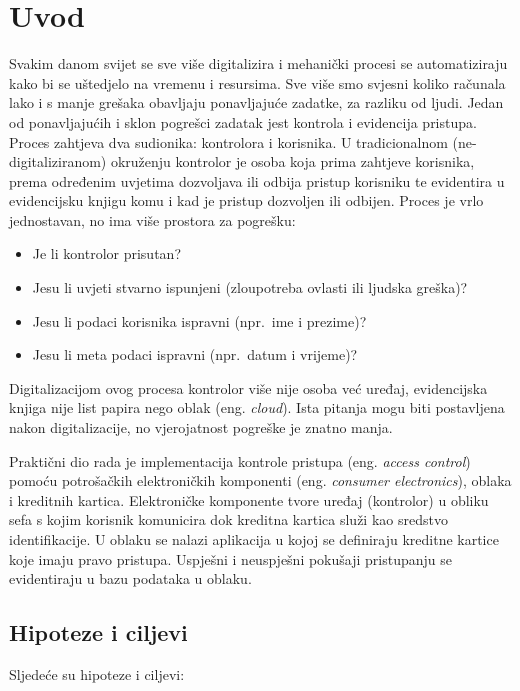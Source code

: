 \chapter{Uvod}

Svakim danom svijet se sve više digitalizira i mehanički procesi se automatiziraju kako bi se uštedjelo na vremenu i resursima.
Sve više smo svjesni koliko računala lako i s manje grešaka obavljaju ponavljajuće zadatke, za razliku od ljudi.
Jedan od ponavljajućih i sklon pogrešci zadatak jest kontrola i evidencija pristupa.
Proces zahtjeva dva sudionika: kontrolora i korisnika.
U tradicionalnom (ne-digitaliziranom) okruženju kontrolor je osoba koja prima zahtjeve korisnika, prema određenim uvjetima
dozvoljava ili odbija pristup korisniku te evidentira u evidencijsku knjigu komu i kad je pristup dozvoljen ili odbijen.
Proces je vrlo jednostavan, no ima više prostora za pogrešku:
\begin{itemize}
    \item Je li kontrolor prisutan?
    \item Jesu li uvjeti stvarno ispunjeni (zloupotreba ovlasti ili ljudska greška)?
    \item Jesu li podaci korisnika ispravni (npr.\ ime i prezime)?
    \item Jesu li meta podaci ispravni (npr.\ datum i vrijeme)?
\end{itemize}
Digitalizacijom ovog procesa kontrolor više nije osoba već uređaj, evidencijska knjiga nije list papira nego oblak (eng. \textit{cloud}).
Ista pitanja mogu biti postavljena nakon digitalizacije, no vjerojatnost pogreške je znatno manja.

Praktični dio rada je implementacija kontrole pristupa (eng. \textit{access control}) pomoću potrošačkih elektroničkih
komponenti (eng. \textit{consumer electronics}), oblaka i kreditnih kartica.
Elektroničke komponente tvore uređaj (kontrolor) u obliku sefa s kojim korisnik komunicira dok kreditna kartica služi kao sredstvo identifikacije.
U oblaku se nalazi aplikacija u kojoj se definiraju kreditne kartice koje imaju pravo pristupa.
Uspješni i neuspješni pokušaji pristupanju se evidentiraju u bazu podataka u oblaku.

\section{Hipoteze i ciljevi}

Sljedeće su hipoteze i ciljevi:

